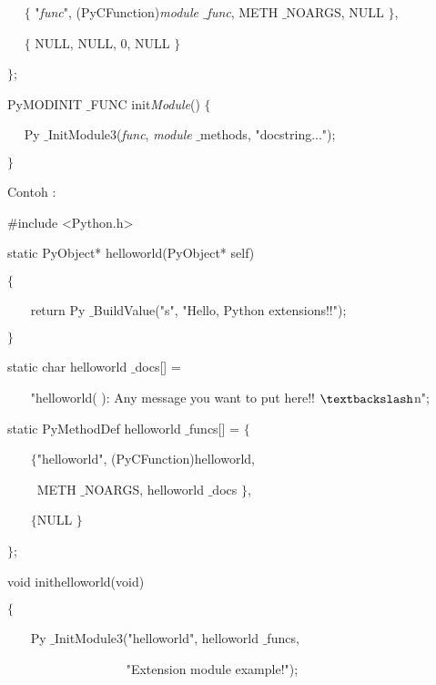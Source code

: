 \noindent 
~~  $  \{  $ "\textit{func}", (PyCFunction)\textit{module $  \_  $func}, METH $  \_  $NOARGS, NULL  $  \}  $, \par
\noindent 
~~  $  \{  $ NULL, NULL, 0, NULL  $  \}  $ \par
\noindent 
 $  \}  $; \par
\vspace{12pt}
\noindent 
PyMODINIT $  \_  $FUNC init\textit{Module}()  $  \{  $ \par
\noindent 
~~ Py $  \_  $InitModule3(\textit{func}, \textit{module} $  \_  $methods, "docstring..."); \par
\noindent 
 $  \}  $ \par
\vspace{12pt}
\vspace{12pt}
\noindent 
Contoh : \par
\noindent 
 $  \#  $include <Python.h> \par
\vspace{12pt}
\noindent 
static PyObject* helloworld(PyObject* self) \par
\noindent 
 $  \{  $ \par
\noindent 
~~~ return Py $  \_  $BuildValue("s", "Hello, Python extensions!!"); \par
\noindent 
 $  \}  $ \par
\vspace{12pt}
\noindent 
static char helloworld $  \_  $docs[] = \par
\noindent 
~~~ "helloworld( ): Any message you want to put here!! $  \textbackslash  $n"; \par
\vspace{12pt}
\noindent 
static PyMethodDef helloworld $  \_  $funcs[] =  $  \{  $ \par
\noindent 
~~~  $  \{  $"helloworld", (PyCFunction)helloworld,  \par
\noindent 
~~~~ METH $  \_  $NOARGS, helloworld $  \_  $docs $  \}  $, \par
\noindent 
~~~  $  \{  $NULL $  \}  $ \par
\noindent 
 $  \}  $; \par
\vspace{12pt}
\noindent 
void inithelloworld(void) \par
\noindent 
 $  \{  $ \par
\noindent 
~~~ Py $  \_  $InitModule3("helloworld", helloworld $  \_  $funcs, \par
\noindent 
~~~~~~~~~~~~~~~~~~ "Extension module example!"); \par
